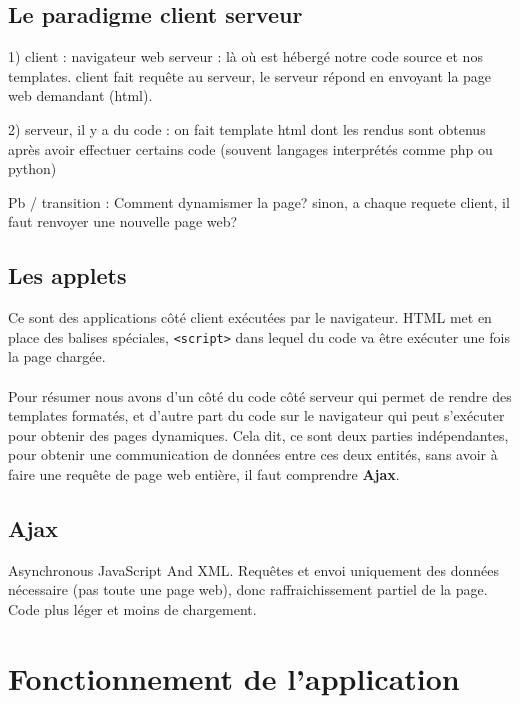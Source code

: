 	\subsection{Le paradigme client serveur}
		1) 	client : navigateur web
		serveur : là où est hébergé notre code source et nos templates.
		client fait requête au serveur, le serveur répond en envoyant la page web demandant (html).
		
		2)	serveur, il y a du code : on fait template html dont les rendus sont obtenus après avoir effectuer certains code (souvent langages interprétés comme php ou python)
		
		Pb / transition : Comment dynamismer la page? sinon, a chaque requete client, il faut renvoyer une nouvelle page web?
	\subsection{Les applets}
		Ce sont des applications côté client exécutées par le navigateur. HTML met en place des balises spéciales, \lstinline!<script>! dans lequel du code va être exécuter une fois la page chargée.
		\paragraph{}Pour résumer nous avons d'un côté du code côté serveur qui permet de rendre des templates formatés, et d'autre part du code sur le navigateur qui peut s'exécuter pour obtenir des pages dynamiques. Cela dit, ce sont deux parties indépendantes, pour obtenir une communication de données entre ces deux entités, sans avoir à faire une requête de page web entière, il faut comprendre \textbf{Ajax}.
		
	\subsection{Ajax}
		Asynchronous JavaScript And XML. Requêtes et envoi uniquement des données nécessaire (pas toute une page web), donc raffraichissement partiel de la page. Code plus léger et moins de chargement.
			
	\section{Fonctionnement de l'application}
